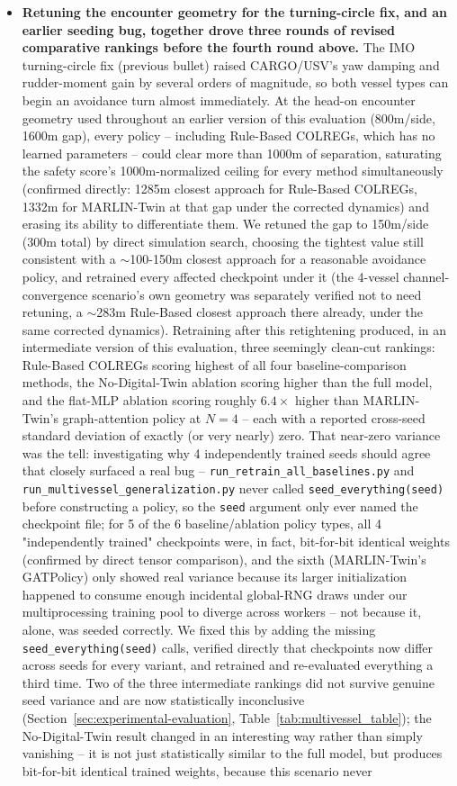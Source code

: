 \documentclass[journal,twocolumn,10pt]{IEEEtran}
\begin{document}
\begin{itemize}
    \item \textbf{Retuning the encounter geometry for the turning-circle fix, and an earlier seeding bug, together drove three rounds of revised comparative rankings before the fourth round above.} The IMO turning-circle fix (previous bullet) raised CARGO/USV's yaw damping and rudder-moment gain by several orders of magnitude, so both vessel types can begin an avoidance turn almost immediately. At the head-on encounter geometry used throughout an earlier version of this evaluation (800m/side, 1600m gap), every policy -- including Rule-Based COLREGs, which has no learned parameters -- could clear more than 1000m of separation, saturating the safety score's 1000m-normalized ceiling for every method simultaneously (confirmed directly: 1285m closest approach for Rule-Based COLREGs, 1332m for MARLIN-Twin at that gap under the corrected dynamics) and erasing its ability to differentiate them. We retuned the gap to 150m/side (300m total) by direct simulation search, choosing the tightest value still consistent with a $\sim$100-150m closest approach for a reasonable avoidance policy, and retrained every affected checkpoint under it (the 4-vessel channel-convergence scenario's own geometry was separately verified not to need retuning, a $\sim$283m Rule-Based closest approach there already, under the same corrected dynamics). Retraining after this retightening produced, in an intermediate version of this evaluation, three seemingly clean-cut rankings: Rule-Based COLREGs scoring highest of all four baseline-comparison methods, the No-Digital-Twin ablation scoring higher than the full model, and the flat-MLP ablation scoring roughly $6.4\times$ higher than MARLIN-Twin's graph-attention policy at $N=4$ -- each with a reported cross-seed standard deviation of exactly (or very nearly) zero. That near-zero variance was the tell: investigating why 4 independently trained seeds should agree that closely surfaced a real bug -- \texttt{run\_retrain\_all\_baselines.py} and \texttt{run\_multivessel\_generalization.py} never called \texttt{seed\_everything(seed)} before constructing a policy, so the \texttt{seed} argument only ever named the checkpoint file; for 5 of the 6 baseline/ablation policy types, all 4 "independently trained" checkpoints were, in fact, bit-for-bit identical weights (confirmed by direct tensor comparison), and the sixth (MARLIN-Twin's GATPolicy) only showed real variance because its larger initialization happened to consume enough incidental global-RNG draws under our multiprocessing training pool to diverge across workers -- not because it, alone, was seeded correctly. We fixed this by adding the missing \texttt{seed\_everything(seed)} calls, verified directly that checkpoints now differ across seeds for every variant, and retrained and re-evaluated everything a third time. Two of the three intermediate rankings did not survive genuine seed variance and are now statistically inconclusive (Section~\ref{sec:experimental-evaluation}, Table~\ref{tab:multivessel_table}); the No-Digital-Twin result changed in an interesting way rather than simply vanishing -- it is not just statistically similar to the full model, but produces bit-for-bit identical trained weights, because this scenario never 
\end{itemize}
\end{document}

